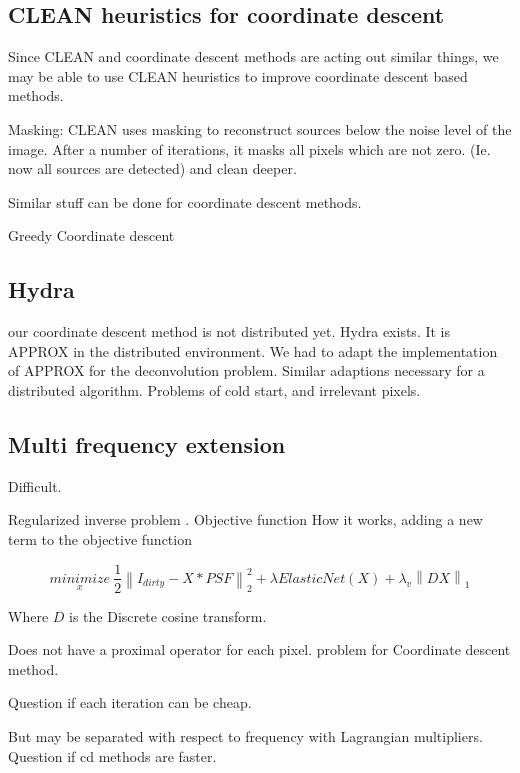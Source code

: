 \subsection{CLEAN heuristics for coordinate descent}
Since CLEAN and coordinate descent methods are acting out similar things, we may be able to use CLEAN heuristics to improve coordinate descent based methods.

Masking: CLEAN uses masking to reconstruct sources below the noise level of the image. After a number of iterations, it masks all pixels which are not zero. (Ie. now all sources are detected) and clean deeper. 

Similar stuff can be done for coordinate descent methods. 

Greedy Coordinate descent

\subsection{Hydra}
our coordinate descent method is not distributed yet. Hydra exists. It is APPROX in the distributed environment.
We had to adapt the implementation of APPROX for the deconvolution problem. Similar adaptions necessary for a distributed algorithm. Problems of cold start, and irrelevant pixels.





\subsection{Multi frequency extension}\label{discussion:mfs}
Difficult.

Regularized inverse problem  \cite{ferrari2015multi}. Objective function 
How it works, adding a new term to the objective function

\begin{equation}\label{cd:deconv}
\underset{x}{minimize} \: \frac{1}{2} \left \| I_{dirty} - X * PSF \right \|_2^2 + \lambda ElasticNet(X) + \lambda_v \left \| DX \right \|_1
\end{equation}

Where $D$ is the Discrete cosine transform.

Does not have a proximal operator for each pixel. problem for Coordinate descent method.

Question if each iteration can be cheap.

But may be separated with respect to frequency with Lagrangian multipliers. Question if cd methods are faster.
